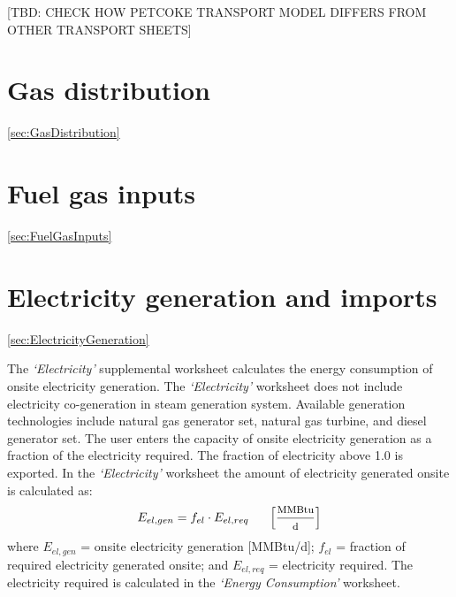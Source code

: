 \documentclass[11pt]{report}
\newcommand{\sheet}[1]{\textit{`{#1}'}}
\begin{document}
{[TBD: CHECK HOW PETCOKE TRANSPORT MODEL DIFFERS FROM OTHER TRANSPORT SHEETS]





\clearpage

\section{Gas distribution}
\ref{sec:GasDistribution}







\clearpage

\section{Fuel gas inputs}
\ref{sec:FuelGasInputs}








\clearpage

\section{Electricity generation and imports}
\ref{sec:ElectricityGeneration}


The \sheet{Electricity} supplemental worksheet calculates the energy consumption of onsite electricity generation. The \sheet{Electricity} worksheet does not include electricity co-generation in steam generation system. Available generation technologies include natural gas generator set, natural gas turbine, and diesel generator set. The user enters the capacity of onsite electricity generation as a fraction of the electricity required. The fraction of electricity above 1.0 is exported. In the \sheet{Electricity} worksheet the amount of electricity generated onsite is calculated as:
\begin{equation} \label{eq:calc_elec_gn_onsite}
E_{el,gen} = f_{el} \cdot E_{el,req} \footnotesize{ \quad\quad\left[\frac{\text{MMBtu}}{\text{d}}\right]}
\end{equation}
where $E_{el,gen}$ = onsite electricity generation [MMBtu/d]; $f_{el}$ = fraction of required electricity generated onsite; and $E_{el,req}$ = electricity required. The electricity required is calculated in the \sheet{Energy Consumption} worksheet.

}
\end{document}
